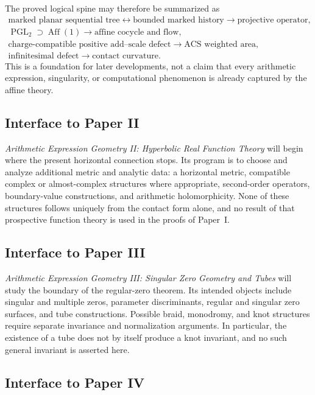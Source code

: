 The proved logical spine may therefore be summarized as
\[
\begin{gathered}
    \text{marked planar sequential tree}
      \longleftrightarrow \text{bounded marked history}
      \longrightarrow \text{projective operator},\\
    \operatorname{PGL}_2
      \supset \operatorname{Aff}(1)
      \longrightarrow \text{affine cocycle and flow},\\
    \text{charge-compatible positive add--scale defect}
      \longrightarrow \text{ACS weighted area},\\
    \text{infinitesimal defect}
      \longrightarrow \text{contact curvature}.
\end{gathered}
\]
This is a foundation for later developments, not a claim that every arithmetic
expression, singularity, or computational phenomenon is already captured by
the affine theory.

\subsection{Interface to Paper II}

\emph{Arithmetic Expression Geometry II: Hyperbolic Real Function Theory}
will begin where the present horizontal connection stops.  Its program is to
choose and analyze additional metric and analytic data: a horizontal metric,
compatible complex or almost-complex structures where appropriate,
second-order operators, boundary-value constructions, and arithmetic
holomorphicity.  None of these structures follows uniquely from the contact
form alone, and no result of that prospective function theory is used in the
proofs of Paper~I.

\subsection{Interface to Paper III}

\emph{Arithmetic Expression Geometry III: Singular Zero Geometry and Tubes}
will study the boundary of the regular-zero theorem.  Its intended objects
include singular and multiple zeros, parameter discriminants, regular and
singular zero surfaces, and tube constructions.  Possible braid, monodromy,
and knot structures require separate invariance and normalization arguments.
In particular, the existence of a tube does not by itself produce a knot
invariant, and no such general invariant is asserted here.

\subsection{Interface to Paper IV}

